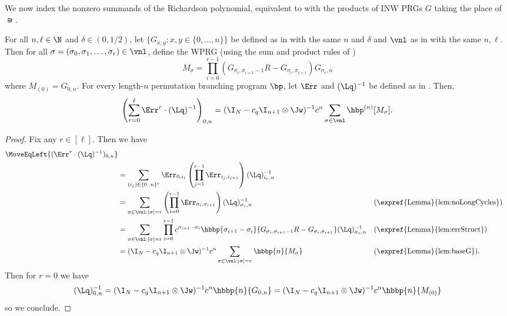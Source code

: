 \documentclass{toc}
\begin{document}
We now index the nonzero summands of the Richardson polynomial, equivalent to  with the products of INW PRGs $G$ taking the place of $\nis$.
\begin{lemma}\label{lem:richardSummandsCycle}
For all $n,\ell \in \N$ and $\delta \in (0,1/2)$, let $\{G_{x,y}:x,y\in\{0,\dots,n\}\}$ be defined as in  with the same $n$ and $\delta$ and $\vnl$ as in  with the same $n,\ell$. Then for all $\sigma=(\sigma_0,\sigma_1,\dots,\sigma_r) \in \vnl$, define the WPRG (using the sum and product rules of 
%
 ) %
\[M_\sigma = \prod_{i=0}^{r-1}(G_{\sigma_i,\sigma_{i+1}-1}R-G_{\sigma_i,\sigma_{i+1}})G_{\sigma_r,n}\]
where $M_{(0)}=G_{0,n}$. For every length-$n$ permutation branching program $\bp$, let $\Err$ and $(\Lq)^{-1}$ be defined as in . Then,
\[\left(\sum_{r=0}^\ell\Err^{r}\cdot(\Lq)^{-1}\right)_{0,n} = (\I_N-c_q\I_{n+1}\otimes \Jw)^{-1}c^n \sum_{\sigma \in \vnl}\hbp^{(n)}[M_\sigma].\]
\end{lemma}
\begin{proof}
Fix any $r \in [\ell]$. %
Then we have  %
\begin{align*}
\MoveEqLeft{(\Err^{r}\cdot(\Lq)^{-1})_{0,n}} \\&= \sum_{(i_j) \in \{0..n\}^r} \Err_{0,i_1}\left(\prod_{j=1}^{r-1}\Err_{i_j,i_{j+1}}\right)(\Lq)^{-1}_{i_r,n}\\
&= \sum_{\sigma\in \vnl:|\sigma|=r}\left(\prod_{i=0}^{r-1}\Err_{\sigma_{i},\sigma_{i+1}}\right)(\Lq)^{-1}_{\sigma_r,n} && \text{(\expref{Lemma}{lem:noLongCycles})}\\
&= \sum_{\sigma\in \vnl:|\sigma|=r}\prod_{i=0}^{r-1}c^{\sigma_{i+1}-\sigma_i}\hbbp{\sigma_{i+1}-\sigma_i}{G_{\sigma_i,\sigma_{i+1}-1}R-G_{\sigma_i,\sigma_{i+1}}}(\Lq)^{-1}_{\sigma_r,n} 
&&\text{(\expref{Lemma}{lem:errStruct})}\\
&=(\I_N-c_q\I_{n+1}\otimes \Jw)^{-1}c^n \sum_{\sigma \in \vnl:|\sigma|=r}\hbbp{n}{M_\sigma} && \text{(\expref{Lemma}{lem:baseG})}.
\end{align*}
Then for $r=0$ we have
$$(\Lq)^{-1}_{0,n} = (\I_N-c_q\I_{n+1}\otimes \Jw)^{-1}c^n\hbbp{n}{G_{0,n}} = (\I_N-c_q\I_{n+1}\otimes \Jw)^{-1}c^n\hbbp{n}{M_{(0)}}$$
so we conclude.
\end{proof}
\end{document}
